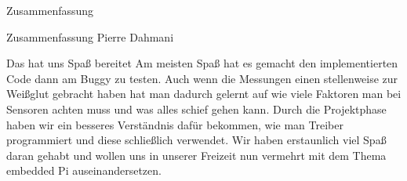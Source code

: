 \documentclass[12pt]{report}
\begin{document}
\begin{section}{Zusammenfassung}
\begin{subsection}{Zusammenfassung Pierre Dahmani}
            \begin{paragraphwithnewline}{Das hat uns Spaß bereitet}
            Am meisten Spaß hat es gemacht den implementierten Code dann am Buggy zu
            testen. Auch wenn die Messungen einen stellenweise zur Weißglut gebracht
            haben hat man dadurch gelernt auf wie viele Faktoren man bei Sensoren
            achten muss und was alles schief gehen kann. Durch die Projektphase
            haben wir ein besseres Verständnis dafür bekommen, wie man Treiber
            programmiert und diese schließlich verwendet. Wir haben erstaunlich
            viel Spaß daran gehabt und wollen uns in unserer Freizeit nun vermehrt
            mit dem Thema embedded Pi auseinandersetzen.
            \end{paragraphwithnewline}
        \end{subsection}
\end{section}
\end{document}
